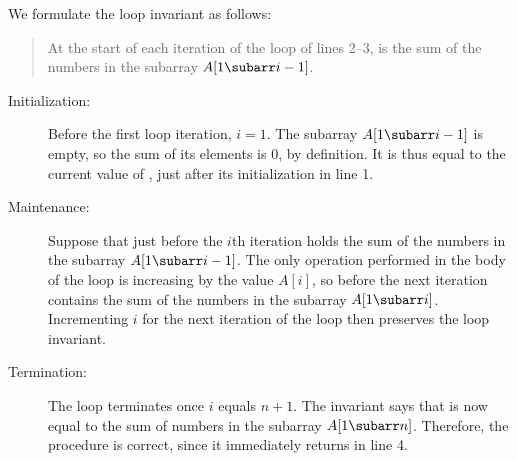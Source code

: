 We formulate the loop invariant as follows:
\begin{quote}
    At the start of each iteration of the  loop of lines 2--3,  is the sum of the numbers in the subarray $A[1\subarr i-1]$.
\end{quote}

\begin{description}
    \item[Initialization:] Before the first loop iteration, $i=1$.
    The subarray $A[1\subarr i-1]$ is empty, so the sum of its elements is 0, by definition.
    It is thus equal to the current value of , just after its initialization in line 1.
    \item[Maintenance:] Suppose that just before the $i$th iteration  holds the sum of the numbers in the subarray $A[1\subarr i-1]$.
    The only operation performed in the body of the loop is increasing  by the value $A[i]$, so before the next iteration  contains the sum of the numbers in the subarray $A[1\subarr i]$.
    Incrementing $i$ for the next iteration of the loop then preserves the loop invariant.
    \item[Termination:] The loop terminates once $i$ equals $n+1$.
    The invariant says that  is now equal to the sum of numbers in the subarray $A[1\subarr n]$.
    Therefore, the procedure is correct, since it immediately returns  in line 4.
\end{description}
